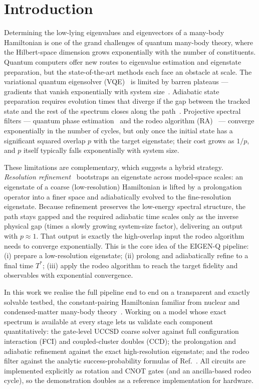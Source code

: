 \documentclass[11pt]{article}
\begin{document}
\section{Introduction}
Determining the low-lying eigenvalues and eigenvectors of a many-body Hamiltonian is
one of the grand challenges of quantum many-body theory, where the Hilbert-space
dimension grows exponentially with the number of constituents.  Quantum computers
offer new routes to eigenvalue estimation and eigenstate preparation, but the
state-of-the-art methods each face an obstacle at scale.  The variational quantum
eigensolver (VQE)~\cite{Peruzzo2014} is limited by barren plateaus --- gradients that
vanish exponentially with system size~\cite{McClean2018}.  Adiabatic state
preparation requires evolution times that diverge if the gap between the tracked
state and the rest of the spectrum closes along the path~\cite{Albash2018}.
Projective spectral filters --- quantum phase estimation~\cite{Abrams1999} and the
rodeo algorithm (RA)~\cite{Choi2021,Qian2024} --- converge exponentially in the
number of cycles, but only once the initial state has a significant squared overlap
$p$ with the target eigenstate; their cost grows as $1/p$, and $p$ itself typically
falls exponentially with system size.

These limitations are complementary, which suggests a hybrid strategy.
\emph{Resolution refinement}~\cite{Bogner2026} bootstraps an eigenstate across
model-space scales: an eigenstate of a coarse (low-resolution) Hamiltonian is lifted
by a prolongation operator into a finer space and adiabatically evolved to the
fine-resolution eigenstate.  Because refinement preserves the low-energy spectral
structure, the path stays gapped and the required adiabatic time scales only as the
inverse physical gap (times a slowly growing system-size factor), delivering an
output with $p\approx 1$.  That output is exactly the high-overlap input the rodeo
algorithm needs to converge exponentially.  This is the core idea of the EIGEN-Q
pipeline: (i) prepare a low-resolution eigenstate; (ii) prolong and adiabatically
refine to a final time $T^\ast$; (iii) apply the rodeo algorithm to reach the target
fidelity and observables with exponential convergence.

In this work we realise the full pipeline end to end on a transparent and exactly
solvable testbed, the constant-pairing Hamiltonian familiar from nuclear and
condensed-matter many-body theory~\cite{LNP936}.  Working on a model whose exact
spectrum is available at every stage lets us validate each component quantitatively:
the gate-level UCCSD coarse solver against full configuration interaction (FCI) and
coupled-cluster doubles (CCD); the prolongation and adiabatic refinement against the
exact high-resolution eigenstate; and the rodeo filter against the analytic
success-probability formulas of Ref.~\cite{Qian2024}.  All circuits are implemented
explicitly as rotation and CNOT gates (and an ancilla-based rodeo cycle), so the
demonstration doubles as a reference implementation for hardware.
\end{document}
